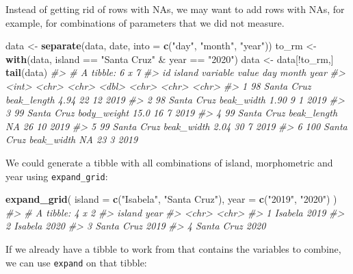 \documentclass[]{book}
\newenvironment{Shaded}{}{}
\newcommand{\CommentTok}[1]{\textcolor[rgb]{0.38,0.63,0.69}{\textit{#1}}}
\newcommand{\DataTypeTok}[1]{\textcolor[rgb]{0.56,0.13,0.00}{#1}}
\newcommand{\KeywordTok}[1]{\textcolor[rgb]{0.00,0.44,0.13}{\textbf{#1}}}
\newcommand{\NormalTok}[1]{#1}
\newcommand{\OperatorTok}[1]{\textcolor[rgb]{0.40,0.40,0.40}{#1}}
\newcommand{\StringTok}[1]{\textcolor[rgb]{0.25,0.44,0.63}{#1}}
\begin{document}
Instead of getting rid of rows with NAs, we may want to add rows with NAs, for example, for combinations of parameters that we did not measure.

\begin{Shaded}
\begin{Highlighting}[]
\NormalTok{data <-}\StringTok{ }\KeywordTok{separate}\NormalTok{(data, date, }\DataTypeTok{into =} \KeywordTok{c}\NormalTok{(}\StringTok{"day"}\NormalTok{, }\StringTok{"month"}\NormalTok{, }\StringTok{"year"}\NormalTok{))}
\NormalTok{to_rm <-}\StringTok{ }\KeywordTok{with}\NormalTok{(data, island }\OperatorTok{==}\StringTok{ "Santa Cruz"} \OperatorTok{&}\StringTok{ }\NormalTok{year }\OperatorTok{==}\StringTok{ "2020"}\NormalTok{)}
\NormalTok{data <-}\StringTok{ }\NormalTok{data[}\OperatorTok{!}\NormalTok{to_rm,]}
\KeywordTok{tail}\NormalTok{(data)}
\CommentTok{#> # A tibble: 6 x 7}
\CommentTok{#>      id island     variable    value day   month year }
\CommentTok{#>   <int> <chr>      <chr>       <dbl> <chr> <chr> <chr>}
\CommentTok{#> 1    98 Santa Cruz beak_length  4.94 22    12    2019 }
\CommentTok{#> 2    98 Santa Cruz beak_width   1.90 9     1     2019 }
\CommentTok{#> 3    99 Santa Cruz body_weight 15.0  16    7     2019 }
\CommentTok{#> 4    99 Santa Cruz beak_length NA    26    10    2019 }
\CommentTok{#> 5    99 Santa Cruz beak_width   2.04 30    7     2019 }
\CommentTok{#> 6   100 Santa Cruz beak_width  NA    23    3     2019}
\end{Highlighting}
\end{Shaded}

We could generate a tibble with all combinations of island, morphometric and year using \texttt{expand\_grid}:

\begin{Shaded}
\begin{Highlighting}[]
\KeywordTok{expand_grid}\NormalTok{(}
  \DataTypeTok{island =} \KeywordTok{c}\NormalTok{(}\StringTok{"Isabela"}\NormalTok{, }\StringTok{"Santa Cruz"}\NormalTok{), }
  \DataTypeTok{year =} \KeywordTok{c}\NormalTok{(}\StringTok{"2019"}\NormalTok{, }\StringTok{"2020"}\NormalTok{)}
\NormalTok{)}
\CommentTok{#> # A tibble: 4 x 2}
\CommentTok{#>   island     year }
\CommentTok{#>   <chr>      <chr>}
\CommentTok{#> 1 Isabela    2019 }
\CommentTok{#> 2 Isabela    2020 }
\CommentTok{#> 3 Santa Cruz 2019 }
\CommentTok{#> 4 Santa Cruz 2020}
\end{Highlighting}
\end{Shaded}

If we already have a tibble to work from that contains the variables to combine, we can use \texttt{expand} on that tibble:
\end{document}
